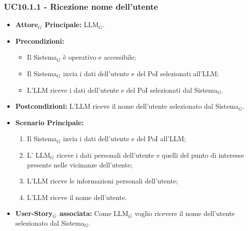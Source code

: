 \documentclass[10pt]{article}
\begin{document}
\begin{justify}
\subsubsection{\textbf{UC10.1.1 - Ricezione nome dell'utente}}
\begin{itemize}
    \item \textbf{Attore$_G$ Principale:} LLM$_G$.
    \item \textbf{Precondizioni:} 
        \begin{itemize}
          \item Il Sistema$_G$ è operativo e accessibile;
          \item Il Sistema$_G$ invia i dati dell'utente e del PoI selezionati all'LLM;
            \item L'LLM riceve i dati dell'utente e del PoI selezionati dal Sistema$_G$.
        \end{itemize}
      \item \textbf{Postcondizioni:} L'LLM riceve il nome dell'utente selezionato dal Sistema$_G$.
    \item \textbf{Scenario Principale:} 
        \begin{enumerate}
          \item Il Sistema$_G$ invia i dati dell'utente e del PoI all'LLM;
        \item L' LLM$_G$ riceve i dati personali dell'utente e quelli del punto di interesse presente nelle vicinanze dell'utente;
          \item L'LLM riceve le informazioni personali dell'utente;
          \item L'LLM riceve il nome dell'utente.
        \end{enumerate}
      \item \textbf{User-Story$_G$ associata:} Come LLM$_G$ voglio ricevere il nome dell'utente selezionato dal Sistema$_G$.
\end{itemize}

\end{justify}
\end{document}
